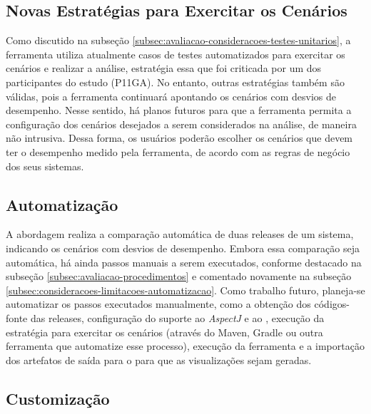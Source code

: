 \subsection{Novas Estratégias para Exercitar os Cenários} \label{subsec:consideracoes-novas-estrategias-exercitar-cenarios}

Como discutido na subseção \ref{subsec:avaliacao-consideracoes-testes-unitarios}, a ferramenta utiliza atualmente casos de testes automatizados para exercitar os cenários e realizar a análise, estratégia essa que foi criticada por um dos participantes do estudo (P11GA). No entanto, outras estratégias também são válidas, pois a ferramenta continuará apontando os cenários com desvios de desempenho. Nesse sentido, há planos futuros para que a ferramenta permita a configuração dos cenários desejados a serem considerados na análise, de maneira não intrusiva. Dessa forma, os usuários poderão escolher os cenários que devem ter o desempenho medido pela ferramenta, de acordo com as regras de negócio dos seus sistemas.

\subsection{Automatização} \label{subsec:consideracoes-automatizacao}

A abordagem realiza a comparação automática de duas releases de um sistema, indicando os cenários com desvios de desempenho. Embora essa comparação seja automática, há ainda passos manuais a serem executados, conforme destacado na subseção \ref{subsec:avaliacao-procedimentos} e comentado novamente na subseção \ref{subsec:consideracoes-limitacoes-automatizacao}. Como trabalho futuro, planeja-se automatizar os passos executados manualmente, como a obtenção dos códigos-fonte das releases, configuração do suporte ao \textit{AspectJ} e ao \textit{\perfMinerName}, execução da estratégia para exercitar os cenários (através do Maven, Gradle ou outra ferramenta que automatize esse processo), execução da ferramenta e a importação dos artefatos de saída para o \textit{\toolName} para que as visualizações sejam geradas.

\subsection{Customização} \label{subsec:consideracoes-customizacao}

